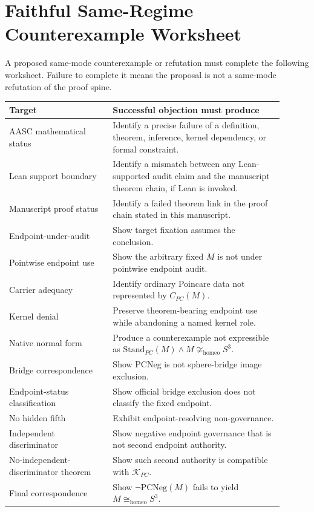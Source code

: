 \documentclass[11pt]{article}
\newcommand{\Sthree}{S^{3}}
\newcommand{\StandPC}{\mathrm{Stand}_{PC}}
\newcommand{\CarrierPC}{C_{PC}}
\newcommand{\KPC}{\mathcal{K}_{PC}}
\newcommand{\PCNeg}{\mathrm{PCNeg}}
\newcommand{\Homeo}{\cong_{\mathrm{homeo}}}
\begin{document}
\section{Faithful Same-Regime Counterexample Worksheet}
A proposed same-mode counterexample or refutation must complete the following worksheet. Failure to complete it means the proposal is not a same-mode refutation of the proof spine.

\begin{longtable}{L{0.34\linewidth}L{0.56\linewidth}}
\toprule
\textbf{Target} & \textbf{Successful objection must produce}\\
\midrule
AASC mathematical status & Identify a precise failure of a definition, theorem, inference, kernel dependency, or formal constraint.\\
Lean support boundary & Identify a mismatch between any Lean-supported audit claim and the manuscript theorem chain, if Lean is invoked.\\
Manuscript proof status & Identify a failed theorem link in the proof chain stated in this manuscript.\\
Endpoint-under-audit & Show target fixation assumes the conclusion.\\
Pointwise endpoint use & Show the arbitrary fixed \(M\) is not under pointwise endpoint audit.\\
Carrier adequacy & Identify ordinary Poincare data not represented by \(\CarrierPC(M)\).\\
Kernel denial & Preserve theorem-bearing endpoint use while abandoning a named kernel role.\\
Native normal form & Produce a counterexample not expressible as \(\StandPC(M)\wedge M\not\Homeo\Sthree\).\\
Bridge correspondence & Show \(\PCNeg\) is not sphere-bridge image exclusion.\\
Endpoint-status classification & Show official bridge exclusion does not classify the fixed endpoint.\\
No hidden fifth & Exhibit endpoint-resolving non-governance.\\
Independent discriminator & Show negative endpoint governance that is not second endpoint authority.\\
No-independent-discriminator theorem & Show such second authority is compatible with \(\KPC\).\\
Final correspondence & Show \(\neg\PCNeg(M)\) fails to yield \(M\Homeo\Sthree\).\\
\bottomrule
\end{longtable}
\end{document}
